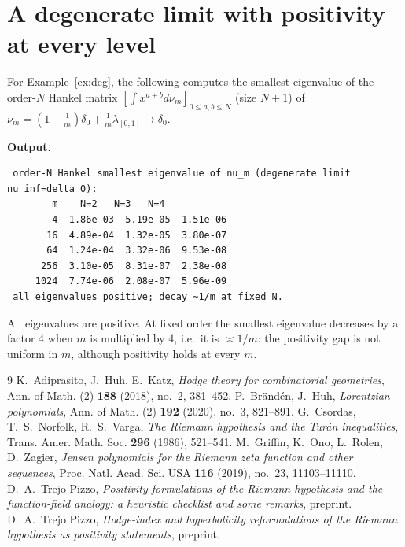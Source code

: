 \documentclass[11pt]{amsart}
\theoremstyle{definition}
\theoremstyle{remark}
\begin{document}
\section{A degenerate limit with positivity at every level}\label{app:deg}
For Example~\ref{ex:deg}, the following computes the smallest eigenvalue of the
order-$N$ Hankel matrix $[\int x^{a+b}d\nu_m]_{0\le a,b\le N}$ (size $N+1$) of $\nu_m=(1-\tfrac1m)\delta_0+\tfrac1m
\lambda_{[0,1]}\to\delta_0$.

\noindent\textbf{Output.}
\begin{lstlisting}
 order-N Hankel smallest eigenvalue of nu_m (degenerate limit nu_inf=delta_0):
        m    N=2   N=3   N=4
        4  1.86e-03  5.19e-05  1.51e-06
       16  4.89e-04  1.32e-05  3.80e-07
       64  1.24e-04  3.32e-06  9.53e-08
      256  3.10e-05  8.31e-07  2.38e-08
     1024  7.74e-06  2.08e-07  5.96e-09
 all eigenvalues positive; decay ~1/m at fixed N.
\end{lstlisting}
All eigenvalues are positive. At fixed order the smallest eigenvalue decreases
by a factor $4$ when $m$ is multiplied by $4$, i.e.\ it is $\asymp1/m$: the
positivity gap is not uniform in $m$, although positivity holds at every $m$.

\begin{thebibliography}{9}
 K.~Adiprasito, J.~Huh, E.~Katz, \emph{Hodge theory for combinatorial geometries}, Ann. of Math. (2) \textbf{188} (2018), no.~2, 381--452.
 P.~Br\"and\'en, J.~Huh, \emph{Lorentzian polynomials}, Ann. of Math. (2) \textbf{192} (2020), no.~3, 821--891.
 G.~Csordas, T.~S.~Norfolk, R.~S.~Varga, \emph{The Riemann hypothesis and the Tur\'an inequalities}, Trans. Amer. Math. Soc. \textbf{296} (1986), 521--541.
 M.~Griffin, K.~Ono, L.~Rolen, D.~Zagier, \emph{Jensen polynomials for the Riemann zeta function and other sequences}, Proc. Natl. Acad. Sci. USA \textbf{116} (2019), no.~23, 11103--11110.
 D.~A.~Trejo Pizzo, \emph{Positivity formulations of the Riemann hypothesis and the function-field analogy: a heuristic checklist and some remarks}, preprint.
 D.~A.~Trejo Pizzo, \emph{Hodge-index and hyperbolicity reformulations of the Riemann hypothesis as positivity statements}, preprint.
\end{thebibliography}
\end{document}
